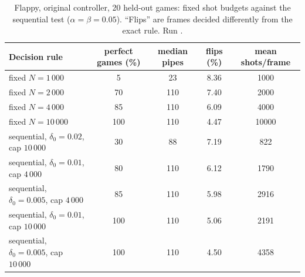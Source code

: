 \begin{table}[t]
\centering\small
\caption{Flappy, original controller, 20 held-out games: fixed shot budgets against the
sequential test ($\alpha=\beta=0.05$).  ``Flips'' are frames decided differently from the
exact rule.  Run .}
\label{tab:sprt}
\begin{tabular}{@{}l S[table-format=3.0] S[table-format=3.0] S[table-format=2.2] S[table-format=5.0]@{}}
\toprule
Decision rule & {perfect games (\%)} & {median pipes} & {flips (\%)} & {mean shots/frame} \\
\midrule
fixed $N = 1\,000$ & 5 & 23 & 8.36 & 1000 \\
fixed $N = 2\,000$ & 70 & 110 & 7.40 & 2000 \\
fixed $N = 4\,000$ & 85 & 110 & 6.09 & 4000 \\
fixed $N = 10\,000$ & 100 & 110 & 4.47 & 10000 \\
sequential, $\delta_0 = 0.02$, cap $10\,000$ & 30 & 88 & 7.19 & 822 \\
sequential, $\delta_0 = 0.01$, cap $4\,000$ & 80 & 110 & 6.12 & 1790 \\
sequential, $\delta_0 = 0.005$, cap $4\,000$ & 85 & 110 & 5.98 & 2916 \\
sequential, $\delta_0 = 0.01$, cap $10\,000$ & 100 & 110 & 5.06 & 2191 \\
sequential, $\delta_0 = 0.005$, cap $10\,000$ & 100 & 110 & 4.50 & 4358 \\
\bottomrule
\end{tabular}
\end{table}

